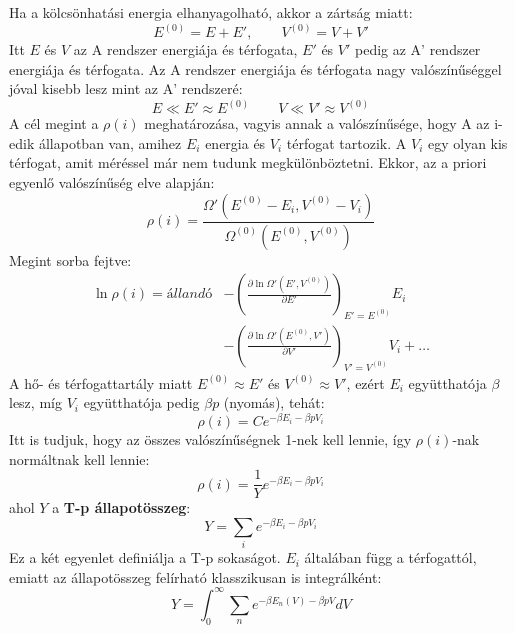 \documentclass[../main.tex]{subfiles}
\begin{document}
Ha a kölcsönhatási energia elhanyagolható, akkor a zártság miatt:
\begin{equation}
    E^{(0)} = E + E', \qquad V^{(0)} = V + V'
\end{equation}
Itt $E$ és $V$ az A rendszer energiája és térfogata, $E'$ és $V'$ pedig az A' rendszer energiája és térfogata. Az A rendszer energiája és térfogata nagy valószínűséggel jóval kisebb lesz mint az A' rendszeré:
\begin{equation}
    E \ll E' \approx E^{(0)} \qquad V \ll V' \approx V^{(0)}
\end{equation}
A cél megint a $\rho(i)$ meghatározása, vagyis annak a valószínűsége, hogy A az i-edik állapotban van, amihez $E_i$ energia és $V_i$ térfogat tartozik. A $V_i$ egy olyan kis térfogat, amit méréssel már nem tudunk
megkülönböztetni. Ekkor, az a priori egyenlő valószínűség elve alapján:
\begin{equation}
    \rho(i) = \frac{\Omega' (E^{(0)} - E_i, V^{(0)} - V_i)}{\Omega^{(0)} (E^{(0)}, V^{(0)})}
\end{equation}
Megint sorba fejtve:
\begin{equation}
    \begin{aligned}
        \ln \rho(i) = állandó &- \left( \frac{\partial \ln \Omega'(E', V^{(0)})}{\partial E'} \right)_{E' = E^{(0)}} E_i \\
        &- \left( \frac{\partial \ln \Omega'(E^{(0)}, V')}{\partial V'} \right)_{V' = V^{(0)}} V_i + \ldots
    \end{aligned}
\end{equation}
A hő- és térfogattartály miatt $E^{(0)} \approx E'$ és $V^{(0)} \approx V'$, ezért $E_i$ együtthatója $\beta$ lesz, míg $V_i$ együtthatója pedig $\beta p$ (nyomás), tehát:
\begin{equation}
    \rho(i) = C e^{-\beta E_i - \beta p V_i}
\end{equation}
Itt is tudjuk, hogy az összes valószínűségnek 1-nek kell lennie, így $\rho(i)$-nak normáltnak kell lennie:
\begin{equation}
    \boxed{\rho(i) = \frac{1}{Y} e^{-\beta E_i - \beta p V_i}}
\end{equation}
ahol $Y$ a \textbf{T-p állapotösszeg}:
\begin{equation}
    Y = \sum_{i} e^{-\beta E_i - \beta p V_i}
\end{equation}
Ez a két egyenlet definiálja a T-p sokaságot. $E_i$ általában függ a térfogattól, emiatt az állapotösszeg felírható klasszikusan is integrálként:
\begin{equation}
    Y = \int_{0}^{\infty} \sum_n e^{-\beta E_n(V) - \beta p V} dV
\end{equation}
\end{document}
